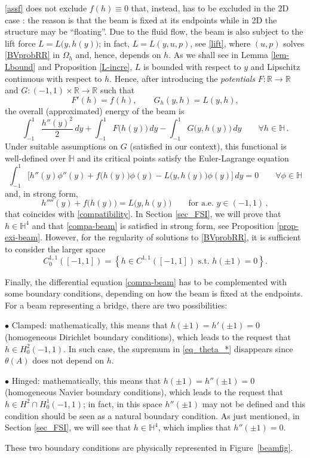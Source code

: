 \documentclass[11pt,a4paper]{amsart}
\def\neweq#1{\begin{equation}\label{#1}}
\def\endeq{\end{equation}}
\def\R{\mathbb{R}}
\theoremstyle{remark}
\theoremstyle{definition}
\numberwithin{equation}{section}
\numberwithin{proposition}{section}
\begin{document}
	\eqref{assf} does not exclude $f(h)\equiv0$ that, instead, has to be excluded in the 2D case \cite{simona,edofil,edofil2,denisgaldi}:
the reason is that the beam is fixed at its endpoints while in 2D the structure may be ``floating''.
	Due to the fluid flow, the beam is also subject to the lift force $L=L\big(y, h(y)\big)$; in fact, $L=L(y, u,p)$, see \eqref{lift},
	where $(u,p)$ solves \eqref{BVprobRR} in $\Omega_h$ and, hence, depends on $h$. As we shall see in Lemma \ref{lem-Lbound} and Proposition \ref{L-incre}, $L$ is bounded with respect to $y$ and Lipschitz continuous with respect to $h$.  Hence, after introducing the {\em potentials} $F: \R \rightarrow \R$ and $G : (-1,1)\times \R \to \R $ such that
	\begin{equation*}\label{F-G}
		F'(h)=f(h),\qquad G_h(y,h)=L(y,h ),
	\end{equation*}
	the overall (approximated) energy of the beam is
	\neweq{totalenergy}
	\int_{-1}^{1}\frac{h''(y)^{2}}2 \, dy+\int_{-1}^{1}F\big(h(y)\big)\, dy-\int_{-1}^{1}G\big(y, h(y)\big)\, dy\qquad\forall h\in\mathbb{H}\, .
	\endeq
	Under suitable assumptions on $G$ (satisfied in our context), this functional is well-defined over $\mathbb{H}$ and its
	critical points satisfy the Euler-Lagrange equation
	$$
	\int_{-1}^{1}\Big[h''(y)\phi''(y)+f\big(h(y)\big)\phi(y)-L\big(y, h(y)\big)\phi(y)\Big]\, dy=0\qquad\forall\phi\in\mathbb{H}
	$$
	and, in strong form,
	\begin{equation}\label{compa-beam}
		h''''(y)+f\big(h(y)\big)=L\big(y, h(y)\big)\qquad \text{for a.e. } y\in(-1,1)\, ,
	\end{equation}
	that coincides with \eqref{compatibility}.
	In Section \ref{sec_FSI}, we will prove that $h\in \mathbb{H}^4$ and that \eqref{compa-beam} is satisfied in strong form, see Proposition \ref{prop-exi-beam}. However, for the regularity of solutions to \eqref{BVprobRR}, it is sufficient to consider the larger space
\begin{equation*}
C_0^{1,1}([-1,1])=\left\{h\in C^{1,1}([-1,1])\mbox{ s.t. }h(\pm1)=0\right\}.
\end{equation*}

    Finally, the differential equation \eqref{compa-beam} has to be complemented with some boundary conditions,
	depending on how the beam is fixed at the endpoints. For a beam representing a bridge, there are two possibilities:\par
	$\bullet$ Clamped: mathematically, this means that $h(\pm1)=h'(\pm1)=0$ (homogeneous Dirichlet boundary conditions), which leads to the request that $h\in H^2_0(-1,1)$. In such case, the supremum in \eqref{eq_theta_*} disappears since $\theta(A)$ does not depend on $h$.\par
$\bullet$ Hinged: mathematically, this means that $h(\pm1)=h''(\pm1)=0$ (homogeneous Navier boundary conditions), which leads to the request that $h\in H^2\cap H^1_0(-1,1)$;
		in fact, in this space $h''(\pm1)$ may not be defined and this condition should be seen as a natural boundary condition. As just mentioned, in Section \ref{sec_FSI}, we will see that $h\in \mathbb{H}^4$, which implies that $h''(\pm1 )=0$.\par
These two boundary conditions are physically represented in Figure~\ref{beamfig}.
	
\end{document}
